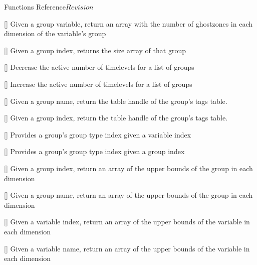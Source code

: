 \begin{cactuspart}{ Functions Reference}{}{$Revision$}
\begin{Lentry}
\item[\code{CCTK\_GroupnghostzonesVN}] [\pageref{CCTK-GroupnghostzonesVN}]
  Given a group variable, return an array with the number of ghostzones
  in each dimension of the variable's group

\item[\code{CCTK\_GroupSizesI}] [\pageref{CCTK-GroupSizesI}]
  Given a group index, returns the size array of that group

\item[\code{CCTK\_GroupStorageDecrease}] [\pageref{CCTK-GroupStorageDecrease}]
  Decrease the active number of timelevels for a list of groups

\item[\code{CCTK\_GroupStorageIncrease}] [\pageref{CCTK-GroupStorageIncrease}]
  Increase the active number of timelevels for a list of groups

\item[\code{CCTK\_GroupTagsTable}] [\pageref{CCTK-GroupTagsTable}]
  Given a group name, return the table handle of the group's tags table.

\item[\code{CCTK\_GroupTagsTableI}] [\pageref{CCTK-GroupTagsTableI}]
  Given a group index, return the table handle of the group's tags table.

\item[\code{CCTK\_GroupTypeFromVarI}] [\pageref{CCTK-GroupTypeFromVarI}]
  Provides a group's group type index given a variable index

\item[\code{CCTK\_GroupTypeI}] [\pageref{CCTK-GroupTypeI}]
  Provides a group's group type index given a group index

\item[\code{CCTK\_GroupubndGI}] [\pageref{CCTK-GroupubndGI}]
  Given a group index, return an array of the upper bounds
  of the group in each dimension

\item[\code{CCTK\_GroupubndGN}] [\pageref{CCTK-GroupubndGN}]
  Given a group name, return an array of the upper bounds
  of the group in each dimension

\item[\code{CCTK\_GroupubndVI}] [\pageref{CCTK-GroupubndVI}]
  Given a variable index, return an array of the upper bounds
  of the variable in each dimension

\item[\code{CCTK\_GroupubndVN}] [\pageref{CCTK-GroupubndVN}]
  Given a variable name, return an array of the upper bounds
  of the variable in each dimension


\end{Lentry}
\end{cactuspart}
